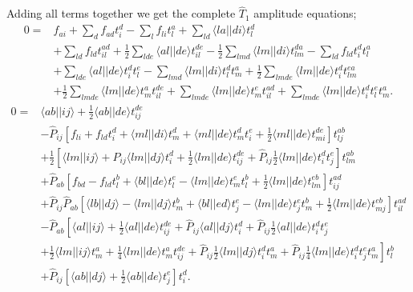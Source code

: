 \documentclass[aps,twocolumn,showpacs,floatfix,nofootinbib,preprintnumbers,superscriptaddress,amsmath,amssymb]{revtex4-1}
\begin{document}
Adding all terms together we get the complete $\hat{T}_1$ amplitude
equations;
\begin{equation}
\label{eq:CC:t1eq_raw}
\begin{split}
0 =& f_{ai} + \sum_d f_{ad} t_i^d - \sum_l f_{li} t_l^a + \sum_{ld}
\langle la||di \rangle t_l^d \\ &+ \sum_{ld} f_{ld} t_{il}^{ad} +
\frac{1}{2} \sum_{lde} \langle al||de \rangle t_{il}^{de} -
\frac{1}{2} \sum_{lmd} \langle lm||di \rangle t_{lm}^{da} - \sum_{ld}
f_{ld} t_i^d t_l^a \\ & + \sum_{lde} \langle al||de \rangle t_i^d
t_l^e - \sum_{lmd} \langle lm||di \rangle t_l^d t_m^a + \frac{1}{2}
\sum_{lmde} \langle lm||de \rangle t_i^d t_{lm}^{ea} \\ &+ \frac{1}{2}
\sum_{lmde} \langle lm||de \rangle t_m^a t_{il}^{de} + \sum_{lmde}
\langle lm||de \rangle t_m^e t_{il}^{ad} + \sum_{lmde} \langle lm||de
\rangle t_i^d t_l^e t_m^a .
\end{split}
\end{equation}
\begin{equation}
\label{eq:CC:t2eq_raw}
\begin{split}
0 =& \langle ab || ij \rangle +\frac{1}{2} \langle ab||de \rangle
t_{ij}^{de} \\ & - \hat{P}_{ij} \left[ f_{li} + f_{ld} t_{i}^d +
  \langle ml||di \rangle t_m^d + \langle ml||de \rangle t_m^d t_i^e
  +\frac{1}{2}\langle ml||de \rangle t_{mi}^{de} \right] t_{lj}^{ab}
\\ & + \frac{1}{2} \left[ \langle lm||ij \rangle + \hat{P}_{ij}
  \langle lm||dj \rangle t_i^d +\frac{1}{2} \langle lm||de \rangle
  t_{ij}^{de} +\hat{P}_{ij} \frac{1}{2} \langle lm||de \rangle t_i^d
  t_j^e \right] t_{lm}^{ab} \\ & + \hat{P}_{ab} \left[ f_{bd} - f_{ld}
  t_l^b + \langle bl||de \rangle t_l^e - \langle lm||de \rangle t_m^e
  t_l^b + \frac{1}{2} \langle lm||de \rangle t_{lm}^{eb} \right]
t_{ij}^{ad} \\ & +\hat{P}_{ij} \hat{P}_{ab} \left[ \langle lb||dj
  \rangle - \langle lm||dj \rangle t_{m}^b + \langle bl||ed \rangle
  t_{j}^e - \langle lm||de \rangle t_j^e t_m^b + \frac{1}{2} \langle
  lm||de \rangle t_{mj}^{eb} \right] t_{il}^{ad} \\ & -\hat{P}_{ab}
\left[ \langle al||ij \rangle + \frac{1}{2} \langle al||de \rangle
  t_{ij}^{de} + \hat{P}_{ij} \langle al||dj \rangle t_i^d +
  \hat{P}_{ij} \frac{1}{2} \langle al||de \rangle t_i^d t_j^e \right.
  \\& \left. + \frac{1}{2} \langle lm||ij \rangle t_m^a + \frac{1}{4}
  \langle lm||de \rangle t_m^a t_{ij}^{de} + \hat{P}_{ij} \frac{1}{2}
  \langle lm||dj \rangle t_i^d t_m^a + \hat{P}_{ij} \frac{1}{4}
  \langle lm||de \rangle t_i^d t_j^e t_m^a \right] t_l^b \\ & +
\hat{P}_{ij} \left[ \langle ab || dj \rangle + \frac{1}{2} \langle
  ab||de \rangle t_j^e \right] t_i^d .
\end{split}
\end{equation}
\end{document}
